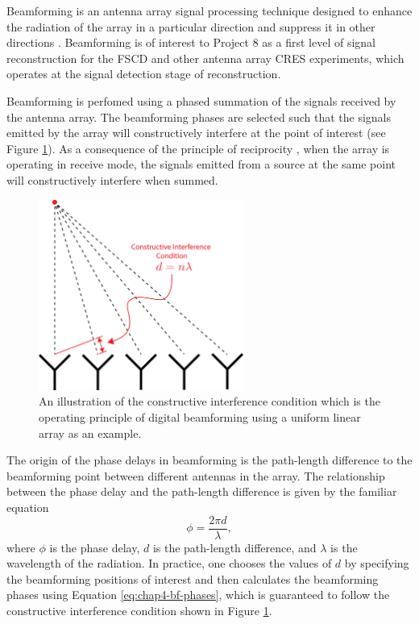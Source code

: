 Beamforming is an antenna array signal processing technique designed to enhance the radiation of the array in a particular direction and suppress it in other directions \cite{balanis2015antenna}. Beamforming is of interest to Project 8 as a first level of signal reconstruction for the FSCD and other antenna array CRES experiments, which operates at the signal detection stage of reconstruction.%

Beamforming is perfomed using a phased summation of the signals received by the antenna array. The beamforming phases are selected such that the signals emitted by the array will constructively interfere at the point of interest (see Figure \ref{fig:chap4-basic-bf}). As a consequence of the principle of reciprocity \cite{reciprocity_theorem}, when the array is operating in receive mode, the signals emitted from a source at the same point will constructively interfere when summed.  
\begin{figure}[htbp]
    \centering
    \includegraphics[width=0.6\textwidth]{figs/Chapter-4/230517_basic_bf.png}
    \caption{An illustration of the constructive interference condition which is the operating principle of digital beamforming using a uniform linear array as an example.}
    \label{fig:chap4-basic-bf}
\end{figure}
The origin of the phase delays in beamforming is the path-length difference to the beamforming point between different antennas in the array. The relationship between the phase delay and the path-length difference is given by the familiar equation
\begin{equation}
    \phi=\frac{2\pi d}{\lambda},
    \label{eq:chap4-bf-phases}
\end{equation}
where $\phi$ is the phase delay, $d$ is the path-length difference, and $\lambda$ is the wavelength of the radiation. In practice, one chooses the values of $d$ by specifying the beamforming positions of interest and then calculates the beamforming phases using Equation \ref{eq:chap4-bf-phases}, which is guaranteed to follow the constructive interference condition shown in Figure \ref{fig:chap4-basic-bf}. 

